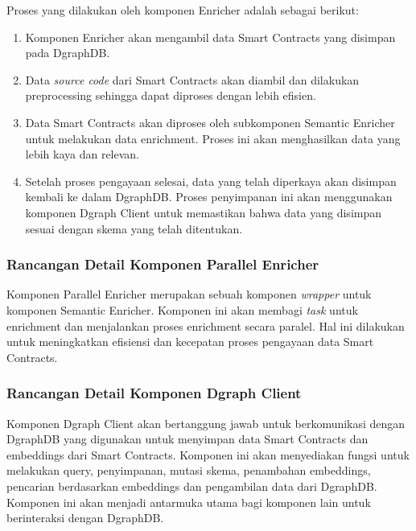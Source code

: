 Proses yang dilakukan oleh komponen Enricher adalah sebagai berikut:
\begin{enumerate}
	\item Komponen Enricher akan mengambil data Smart Contracts yang disimpan pada DgraphDB.
	\item Data \textit{source code} dari Smart Contracts akan diambil dan dilakukan preprocessing sehingga dapat diproses dengan lebih efisien.
	\item Data Smart Contracts akan diproses oleh subkomponen Semantic Enricher untuk melakukan data enrichment. Proses ini akan menghasilkan data yang lebih kaya dan relevan.
	\item Setelah proses pengayaan selesai, data yang telah diperkaya akan disimpan kembali ke dalam DgraphDB. Proses penyimpanan ini akan menggunakan komponen Dgraph Client untuk memastikan bahwa data yang disimpan sesuai dengan skema yang telah ditentukan.
\end{enumerate}

\subsubsection{Rancangan Detail Komponen Parallel Enricher}

Komponen Parallel Enricher merupakan sebuah komponen \textit{wrapper} untuk komponen Semantic Enricher. Komponen ini akan membagi \textit{task} untuk enrichment dan menjalankan proses enrichment secara paralel. Hal ini dilakukan untuk meningkatkan efisiensi dan kecepatan proses pengayaan data Smart Contracts.



\subsubsection{Rancangan Detail Komponen Dgraph Client}

Komponen Dgraph Client akan bertanggung jawab untuk berkomunikasi dengan DgraphDB yang digunakan untuk menyimpan data Smart Contracts dan embeddings dari Smart Contracts. Komponen ini akan menyediakan fungsi untuk melakukan query, penyimpanan, mutasi skema, penambahan embeddings, pencarian berdasarkan embeddings dan pengambilan data dari DgraphDB. Komponen ini akan menjadi antarmuka utama bagi komponen lain untuk berinteraksi dengan DgraphDB.

